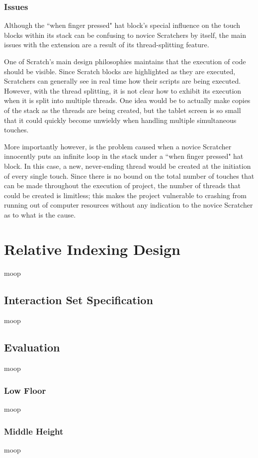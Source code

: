 \subsubsection{Issues}
Although the ``when finger pressed" hat block's special influence on the touch blocks within its stack can be confusing to novice Scratchers by itself, the main issues with the extension are a result of its thread-splitting feature.

One of Scratch's main design philosophies maintains that the execution of code should be visible. Since Scratch blocks are highlighted as they are executed, Scratchers can generally see in real time how their scripts are being executed. However, with the thread splitting, it is not clear how to exhibit its execution when it is split into multiple threads. One idea would be to actually make copies of the stack as the threads are being created, but the tablet screen is so small that it could quickly become unwieldy when handling multiple simultaneous touches.

More importantly however, is the problem caused when a novice Scratcher innocently puts an infinite loop in the stack under a ``when finger pressed" hat block. In this case, a new, never-ending thread would be created at the initiation of every single touch. Since there is no bound on the total number of touches that can be made throughout the execution of project, the number of threads that could be created is limitless; this makes the project vulnerable to crashing from running out of computer resources without any indication to the novice Scratcher as to what is the cause.


\section{Relative Indexing Design}
moop
\subsection{Interaction Set Specification}
moop
\subsection{Evaluation}
moop
\subsubsection{Low Floor}
moop
\subsubsection{Middle Height}
moop

